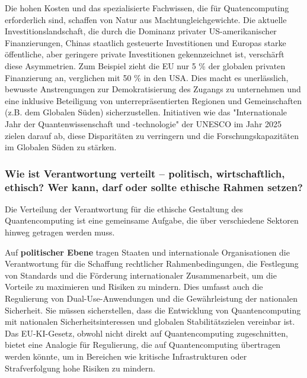 Die hohen Kosten und das spezialisierte Fachwissen, die für Quatencomputing erforderlich sind, schaffen von Natur aus Machtungleichgewichte. Die aktuelle Investitionslandschaft, die durch die Dominanz privater US-amerikanischer Finanzierungen, Chinas staatlich gesteuerte Investitionen und Europas starke öffentliche, aber geringere private Investitionen gekennzeichnet ist, verschärft diese Asymmetrien.\cite{noauthor_europes_2025} Zum Beispiel zieht die EU nur 5 \% der globalen privaten Finanzierung an, verglichen mit 50 \% in den USA.\cite{noauthor_run-up_2025} Dies macht es unerlässlich, bewusste Anstrengungen zur Demokratisierung des Zugangs zu unternehmen und eine inklusive Beteiligung von unterrepräsentierten Regionen und Gemeinschaften (z.B. dem Globalen Süden) sicherzustellen.\cite{arrow_holistic_2023} Initiativen wie das "Internationale Jahr der Quantenwissenschaft und -technologie" der UNESCO im Jahr 2025 zielen darauf ab, diese Disparitäten zu verringern und die Forschungskapazitäten im Globalen Süden zu stärken.\cite{noauthor_opening_2025}

\subsubsection{Wie ist Verantwortung verteilt – politisch, wirtschaftlich, ethisch? Wer kann, darf oder sollte ethische Rahmen setzen?}
Die Verteilung der Verantwortung für die ethische Gestaltung des Quantencomputing ist eine gemeinsame Aufgabe, die über verschiedene Sektoren hinweg getragen werden muss.

Auf \textbf{politischer Ebene} tragen Staaten und internationale Organisationen die Verantwortung für die Schaffung rechtlicher Rahmenbedingungen, die Festlegung von Standards und die Förderung internationaler Zusammenarbeit, um die Vorteile zu maximieren und Risiken zu mindern.\cite{noauthor_blog_nodate} Dies umfasst auch die Regulierung von Dual-Use-Anwendungen und die Gewährleistung der nationalen Sicherheit. Sie müssen sicherstellen, dass die Entwicklung von Quantencomputing mit nationalen Sicherheitsinteressen und globalen Stabilitätszielen vereinbar ist.\cite{noauthor_quantum_nodate-7} Das EU-KI-Gesetz, obwohl nicht direkt auf Quantencomputing zugeschnitten, bietet eine Analogie für Regulierung, die auf Quantencomputing übertragen werden könnte, um in Bereichen wie kritische Infrastrukturen oder Strafverfolgung hohe Risiken zu mindern.\cite{european_commission_directorate_general_for_communications_networks_content_and_technology_ethik-leitlinien_2019} 


